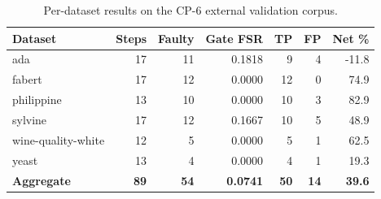 \begin{table}[htbp]
\centering
\caption{Per-dataset results on the CP-6 external validation corpus.}
\label{tab:cp6_per_dataset}
\small
\begin{tabular}{lrrrrrr}
\toprule
Dataset & Steps & Faulty & Gate FSR & TP & FP & Net \% \\
\midrule
ada & 17 & 11 & 0.1818 & 9 & 4 & -11.8 \\
fabert & 17 & 12 & 0.0000 & 12 & 0 & 74.9 \\
philippine & 13 & 10 & 0.0000 & 10 & 3 & 82.9 \\
sylvine & 17 & 12 & 0.1667 & 10 & 5 & 48.9 \\
wine-quality-white & 12 & 5 & 0.0000 & 5 & 1 & 62.5 \\
yeast & 13 & 4 & 0.0000 & 4 & 1 & 19.3 \\
\midrule
\textbf{Aggregate} & \textbf{89} & \textbf{54} & \textbf{0.0741} & \textbf{50} & \textbf{14} & \textbf{39.6} \\
\bottomrule
\end{tabular}
\end{table}